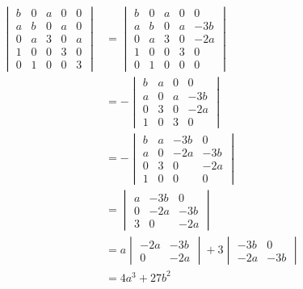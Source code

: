 \begin{enumerate}
		\begin{align*}
			\begin{vmatrix}
				b&0&a&0&0\\
				a&b&0&a&0\\
				0&a&3&0&a\\
				1&0&0&3&0\\
				0&1&0&0&3
			\end{vmatrix} &= 
			\begin{vmatrix}
				b&0&a&0&0\\
				a&b&0&a&-3b\\
				0&a&3&0&-2a\\
				1&0&0&3&0\\
				0&1&0&0&0
			\end{vmatrix}
			\\
			&= -
			\begin{vmatrix}
				b&a&0&0\\
				a&0&a&-3b\\
				0&3&0&-2a\\
				1&0&3&0
			\end{vmatrix}
			\\
			&= -
			\begin{vmatrix}
				b&a&-3b&0\\
				a&0&-2a&-3b\\
				0&3&0&-2a\\
				1&0&0&0
			\end{vmatrix}
			\\
			&= 
			\begin{vmatrix}
				a&-3b&0\\
				0&-2a&-3b\\
				3&0&-2a
			\end{vmatrix}
			\\
			&= a
			\begin{vmatrix}
				-2a&-3b\\
				0&-2a
			\end{vmatrix} + 3
			\begin{vmatrix}
				-3b&0\\-2a&-3b
			\end{vmatrix}\\
			&= 4a^3 + 27b^2 \\
		\end{align*}


\end{enumerate}
